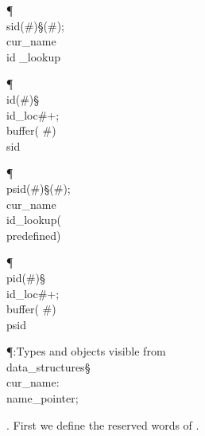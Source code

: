 \Y\P\4\D\\{sid}\?\1(\?\#\?\2)\S\1(\?\#\?\2)\?; \\{cur\_name}\?\K\?\\{id%
\_lookup}\?\6
\?\par
\P\4\D\\{id}\?\1(\?\#\?\2)\S\?\\{id\_loc}\?\K\?\#\?+; \\{buffer}\?\1(\?%
\to\?\#\?\2)\K\?\\{sid}\?\6
\?\par
\P\4\D\\{psid}\?\1(\?\#\?\2)\S\1(\?\#\?\2)\?;\5
\\{cur\_name}\?\K\?\\{id\_lookup}\?\1(\?\\{predefined}\?\2)\?\par
\P\4\D\\{pid}\?\1(\?\#\?\2)\S\?\\{id\_loc}\?\K\?\#\?+; \\{buffer}\?\1(\?%
\to\?\#\?\2)\K\?\\{psid}\?\6
\?\par
\Y\P\?\4:Types and objects visible from \\{data\_structures}\X\mathrel{+}\S%
\?\6
\\{cur\_name}\?:\?\\{name\_pointer};%
\par
\fi

. First we define the reserved words of \ADA.

